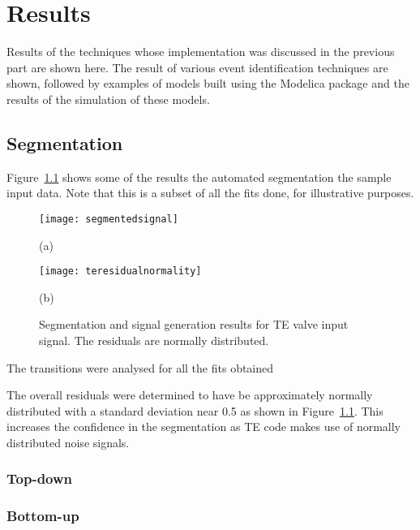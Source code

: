 \chapter{Results}\label{chap:results}
\begin{overview}
  Results of the techniques whose implementation was discussed in the
  previous part are shown here.  The result of various event
  identification techniques are shown, followed by examples of models
  built using the Modelica package and the results of the simulation of these models.
\end{overview}

\section{Segmentation}\label{sec:res:segmentation}
Figure~\ref{fig:segmentationresults} shows some of the results the automated segmentation the sample input data.  
Note that this is a subset of all the fits done, for illustrative purposes.  

\begin{figure}[htbp]
  \centering
  \texttt{[image: segmentedsignal]}
  
(a)

  \texttt{[image: teresidualnormality]}

(b)

  \caption{Segmentation and signal generation results for TE valve input signal.  The residuals are normally distributed.}
  \label{fig:segmentationresults}
\end{figure}

The transitions were analysed for all the fits obtained

The overall residuals were determined to have be approximately
normally distributed with a standard deviation near 0.5 as shown in
Figure~\ref{fig:segmentationresults}.  This increases the confidence in the
segmentation as TE code makes use of normally distributed noise
signals.

\subsection{Top-down}

\subsection{Bottom-up}

